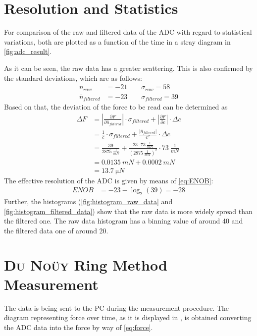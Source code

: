    \section{Resolution and Statistics}
        For comparison of the raw and filtered data of the ADC with regard to statistical variations, both are
        plotted as a function of the time in a stray diagram in \cref{fig:adc_result}.\par
        As it can be seen, the raw data has a greater scattering. This is also confirmed by the standard deviations, which are as follows:
        \begin{align*}
            \bar{n}_{raw}       &=-21 \qquad \sigma_{raw}=58\\
            \bar{n}_{filtered}  &=-23 \qquad \sigma_{filtered}=39
        \end{align*}
        Based on that, the deviation of the force to be read can be determined as
        \begin{align}
            \Delta F    &=\left| \frac{\partial F}{\partial \bar{n}_{filtered}} \right| \cdot \sigma_{filtered} + \left| \frac{\partial F}{\partial c} \right| \cdot \Delta c \nonumber \\
                        &=\frac{1}{c} \cdot \sigma_{filtered} + \frac{\left|\bar{n}_{filtered}\right|}{c^2} \cdot \Delta c \nonumber \\
                        &=\frac{39}{\SI{2875}{\frac{1}{mN}}} + \frac{23 \cdot \SI{73}{\frac{1}{mN}}}{(\SI{2875}{\frac{1}{mN}})^2} \cdot \SI{73}{\frac{1}{mN}} \nonumber \\
                        &=\SI{0.0135}{mN}+\SI{0.0002}{mN} \nonumber \\
                        &=\SI{13.7}{\micro N}
        \end{align}
        The effective resolution of the ADC is given by means of \cref{eq:ENOB}:
        \begin{align*}
            ENOB&=-23-\log_2(39)=-28
        \end{align*}
        Further, the histograms (\cref{fig:histogram_raw_data} and \cref{fig:histogram_filtered_data}) show that the raw data is more widely spread than the filtered one. The raw data histogram has a binning value of around 40 and the filtered data one of around 20.
    \section{\textsc{Du Noüy} Ring Method Measurement}
        The data is being sent to the PC during the measurement procedure. The diagram representing force over time, as it
        is displayed in , is obtained converting the ADC data into the force by way of \cref{eq:force}. 
